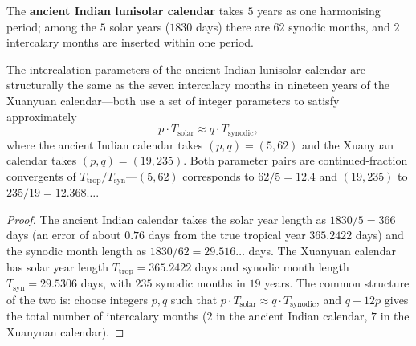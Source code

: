 \begin{definition}\label{def:indian_calendar}
The \textbf{ancient Indian lunisolar calendar} takes \(5\) years as one harmonising period; among the \(5\) solar years (\(1830\) days) there are \(62\) synodic months, and \(2\) intercalary months are inserted within one period.
\end{definition}

\begin{proposition}\label{prop:indian_calendar_intercalation}
The intercalation parameters of the ancient Indian lunisolar calendar are structurally the same as the seven intercalary months in nineteen years of the Xuanyuan calendar---both use a set of integer parameters to satisfy approximately
\[
p\cdot T_{\text{solar}}\approx q\cdot T_{\text{synodic}},
\]
where the ancient Indian calendar takes \((p,q)=(5,62)\) and the Xuanyuan calendar takes \((p,q)=(19,235)\). Both parameter pairs are continued-fraction convergents of \(T_{\text{trop}}/T_{\text{syn}}\)---\((5,62)\) corresponds to \(62/5=12.4\) and \((19,235)\) to \(235/19=12.368\ldots\).
\end{proposition}

\begin{proof}
The ancient Indian calendar takes the solar year length as \(1830/5=366\) days (an error of about \(0.76\) days from the true tropical year \(365.2422\) days) and the synodic month length as \(1830/62=29.516\ldots\) days. The Xuanyuan calendar has solar year length \(T_{\text{trop}}=365.2422\) days and synodic month length \(T_{\text{syn}}=29.5306\) days, with \(235\) synodic months in \(19\) years. The common structure of the two is: choose integers \(p,q\) such that \(p\cdot T_{\text{solar}}\approx q\cdot T_{\text{synodic}}\), and \(q-12p\) gives the total number of intercalary months (\(2\) in the ancient Indian calendar, \(7\) in the Xuanyuan calendar).
\end{proof}

